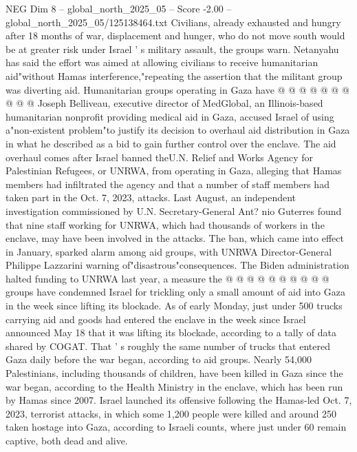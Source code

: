 \begin{textsample}{NEG Dim 8 – global\_north\_2025\_05 – Score -2.00 – global\_north\_2025\_05/125138464.txt}
Civilians, already exhausted and hungry after 18 months of war, displacement and hunger, who do not move south would be at greater risk under Israel ' s military assault, the groups warn.
Netanyahu has said the effort was aimed at allowing civilians to receive humanitarian aid"without Hamas interference,"repeating the assertion that the militant group was diverting aid.
Humanitarian groups operating in Gaza have @ @ @ @ @ @ @ @ @ @ Joseph Belliveau, executive director of MedGlobal, an Illinois-based humanitarian nonprofit providing medical aid in Gaza, accused Israel of using a"non-existent problem"to justify its decision to overhaul aid distribution in Gaza in what he described as a bid to gain further control over the enclave.
The aid overhaul comes after Israel banned theU.N.
Relief and Works Agency for Palestinian Refugees, or UNRWA, from operating in Gaza, alleging that Hamas members had infiltrated the agency and that a number of staff members had taken part in the Oct. 7, 2023, attacks.
Last August, an independent investigation commissioned by U.N.
Secretary-General Ant? nio Guterres found that nine staff working for UNRWA, which had thousands of workers in the enclave, may have been involved in the attacks.
The ban, which came into effect in January, sparked alarm among aid groups, with UNRWA Director-General Philippe Lazzarini warning of"disastrous"consequences.
The Biden administration halted funding to UNRWA last year, a measure the @ @ @ @ @ @ @ @ @ @ groups have condemned Israel for trickling only a small amount of aid into Gaza in the week since lifting its blockade.
As of early Monday, just under 500 trucks carrying aid and goods had entered the enclave in the week since Israel announced May 18 that it was lifting its blockade, according to a tally of data shared by COGAT.
That ' s roughly the same number of trucks that entered Gaza daily before the war began, according to aid groups.
Nearly 54,000 Palestinians, including thousands of children, have been killed in Gaza since the war began, according to the Health Ministry in the enclave, which has been run by Hamas since 2007.
Israel launched its offensive following the Hamas-led Oct. 7, 2023, terrorist attacks, in which some 1,200 people were killed and around 250 taken hostage into Gaza, according to Israeli counts, where just under 60 remain captive, both dead and alive.

\end{textsample}
